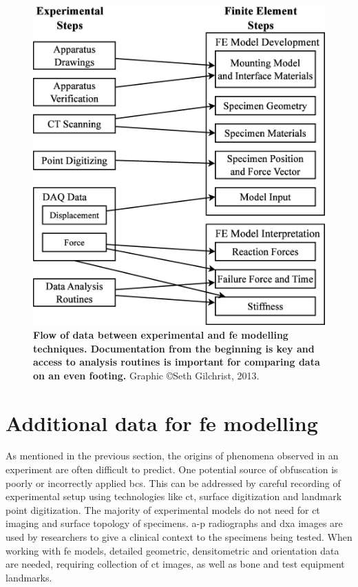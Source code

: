 \begin{figure}
\centering
\includegraphics[height=\textwidth]{./testing_fe_modelling/figures/Dataflow}
\caption[Experimental and \acs*{fe} data flow]{\textbf{Flow of data between experimental and \ac{fe} modelling techniques. Documentation from the beginning is key and access to analysis routines is important for comparing data on an even footing.} Graphic \copyright Seth Gilchrist, 2013.}
\label{fig:modelling_Dataflow}
\end{figure}

\section{Additional data for \acs*{fe} modelling}
\label{sec:modelling_additional}
As mentioned in the previous section, the origins of phenomena observed in an experiment are often difficult to predict.
One potential source of obfuscation is poorly or incorrectly applied \acp{bc}.
This can be addressed by careful recording of experimental setup using technologies like \ac{ct}, surface digitization and landmark point digitization.
The majority of experimental models do not need for \ac{ct} imaging and surface topology of specimens.
\acs{a-p} radiographs and \ac{dxa} images are used by researchers to give a clinical context to the specimens being tested.
When working with \ac{fe} models, detailed geometric, densitometric and orientation data are needed, requiring collection of \ac{ct} images, as well as bone and test equipment landmarks.

